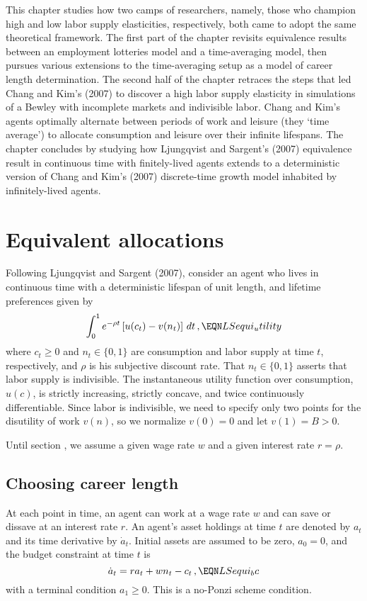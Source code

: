 This chapter studies  how two camps of
researchers, namely, those who champion high and low labor supply elasticities,
respectively, both came to adopt the same theoretical framework.
The first part  of the chapter revisits equivalence
results between an employment lotteries model and a time-averaging
model, then pursues various extensions to the time-averaging setup as a model of  career
length determination. The second half of the chapter retraces the  steps that led  Chang and
Kim's (2007) to discover a high labor supply elasticity in
simulations of a Bewley with incomplete markets and indivisible
labor. Chang and Kim's agents optimally alternate between periods of work and leisure
(they `time average')   to  allocate consumption
and leisure over their infinite lifespans. The chapter concludes by studying
how Ljungqvist and Sargent's (2007) equivalence result in continuous
time with finitely-lived agents extends to a deterministic version
of Chang and Kim's (2007) discrete-time growth model inhabited by
infinitely-lived agents.

%
%





\section{Equivalent allocations}\label{sec:LSequi}%
Following Ljungqvist and Sargent (2007), consider an agent who
lives in continuous time with a deterministic
lifespan of unit length, and lifetime preferences given by
$$
\int_0^1 e^{-\rho t} \left[u(c_t) - v(n_t) \right]\,dt\,,
\EQN LSequi_utility
$$
where $c_t\geq 0$ and $n_t\in \{0,1\}$ are consumption and labor supply
at time $t$, respectively, and $\rho$ is his subjective discount rate.
That $n_t\in \{0,1\}$ asserts that labor
supply is indivisible. The instantaneous utility function over
consumption, $u(c)$, is strictly increasing, strictly concave, and
twice continuously differentiable. Since labor is
indivisible, we need  to specify only two points for the disutility
of work $v(n)$, so we normalize $v(0)=0$ and let $v(1)=B > 0$.

Until section , we  assume a given wage rate $w$ and a
given interest rate $r=\rho$.



\subsection{Choosing career length}\label{sec:LS_lifetime}%
At each point in time, an agent can  work at a wage rate
$w$ and can save or dissave at an interest rate $r$. An agent's asset
holdings at time $t$ are denoted by $a_t$ and its time derivative
by $\dot{a}_t$. Initial assets are assumed to be zero, $a_0=0$, and
the budget constraint at time $t$ is
$$
\dot{a}_t = r a_t + w n_t - c_t\,,
\EQN LSequi_bc
$$
with a terminal condition $a_1\geq 0$. This is a no-Ponzi scheme condition.

